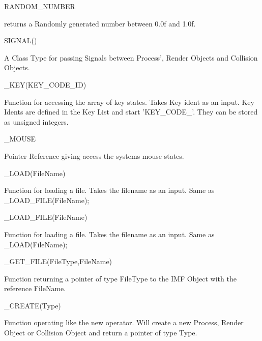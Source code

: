 \begin{DoxyItemize}
\item RANDOM\_\-NUMBER
\begin{DoxyItemize}
\item returns a Randomly generated number between 0.0f and 1.0f.
\end{DoxyItemize}
\item SIGNAL()
\begin{DoxyItemize}
\item A Class Type for passing Signals between Process', Render Objects and Collision Objects.
\end{DoxyItemize}
\item \_\-KEY(KEY\_\-CODE\_\-ID)
\begin{DoxyItemize}
\item Function for accessing the array of key states. Takes Key ident as an input. Key Idents are defined in the Key List and start 'KEY\_\-CODE\_\-'. They can be stored as unsigned integers.
\end{DoxyItemize}
\item \_\-MOUSE
\begin{DoxyItemize}
\item Pointer Reference giving access the systems mouse states.
\end{DoxyItemize}
\item \_\-LOAD(FileName)
\begin{DoxyItemize}
\item Function for loading a file. Takes the filename as an input. Same as \_\-LOAD\_\-FILE(FileName);
\end{DoxyItemize}
\item \_\-LOAD\_\-FILE(FileName)
\begin{DoxyItemize}
\item Function for loading a file. Takes the filename as an input. Same as \_\-LOAD(FileName);
\end{DoxyItemize}
\item \_\-GET\_\-FILE(FileType,FileName)
\begin{DoxyItemize}
\item Function returning a pointer of type FileType to the IMF Object with the reference FileName.
\end{DoxyItemize}
\item \_\-CREATE(Type)
\begin{DoxyItemize}
\item Function operating like the new operator. Will create a new Process, Render Object or Collision Object and return a pointer of type Type.

\end{DoxyItemize}
\end{DoxyItemize}
